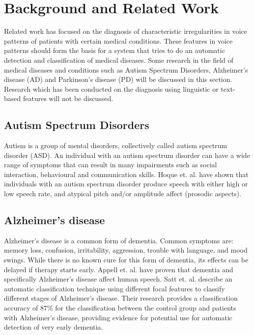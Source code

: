 \documentclass[conference]{IEEEtran}
\begin{document}


\section{Background and Related Work} \label{research}
Related work has focused on the diagnosis of characteristic irregularities in voice patterns of patients with certain medical conditions. These features in voice patterns should form the basis for a system that tries to do an automatic detection and classification of medical diseases. Some research in the field of medical diseases and conditions such as Autism Spectrum Disorders, Alzheimer’s disease (AD) and Parkinson’s disease (PD) will be discussed in this section. Research which has been conducted on the diagnosis using linguistic or text-based features will not be discussed.

\subsection{Autism Spectrum Disorders}
Autism is a group of mental disorders, collectively called autism spectrum disorder (ASD). An individual with an autism spectrum disorder can have a wide range of symptoms that can result in many impairments such as social interaction, behavioural and communication skills. \cite{c4}
Hoque et. al. have shown that individuals with an autism spectrum disorder produce speech with either high or low speech rate, and atypical pitch and/or amplitude affect (prosodic aspects). \cite{c5}

\subsection{Alzheimer’s disease}
Alzheimer’s disease is a common form of dementia. Common symptoms are: memory loss, confusion, irritability, aggression, trouble with language, and mood swings. While there is no known cure for this form of dementia, its effects can be delayed if therapy starts early. \cite{c6} Appell et. al. have proven that dementia and specifically Alzheimer’s disease affect human speech. \cite{c7} Satt et. al. describe an automatic classification technique using different focal features to classify different stages of Alzheimer's disease. Their research provides a classification accuracy of 87\% for the classification between the control group and patients with Alzheimer's disease, providing evidence for potential use for automatic detection of very early dementia. \cite{c8}
\end{document}
